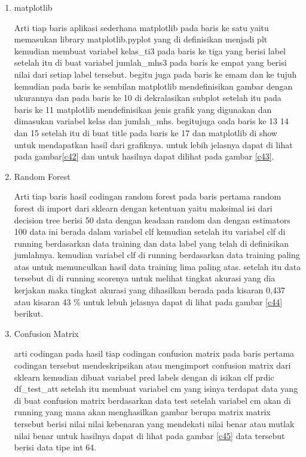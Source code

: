 \begin{enumerate}
\item matplotlib\par
Arti tiap baris aplikasi sederhana matplotlib pada baris ke satu yaitu memasukan library matplotlib.pyplot yang di definisikan menjadi plt kemudian membuat variabel kelas\_ti3 pada baris ke tiga yang berisi label setelah itu di buat variabel jumlah\_mhs3 pada baris ke empat yang berisi nilai dari setiap label tersebut. begitu juga pada baris ke emam dan ke tujuh kemudian pada baris ke sembilan matplotlib mendefinisikan gambar dengan ukurannya dan pada baris ke 10 di dekralasikan subplot setelah itu pada baris ke 11 matplotlib mendefinisikan jenis grafik yang digunakan dan dimasukan variabel kelas dan jumlah\_mhs. begitujuga oada baris ke 13 14 dan 15 setelah itu di buat title  pada baris ke 17 dan matplotlib di show untuk mendapatkan hasil dari grafiknya. untuk lebih jelasnya dapat di lihat pada gambar\ref{c42} dan untuk hasilnya dapat dilihat pada gambar \ref{c43}.

\item Random Forest\par
Arti tiap baris hasil codingan random forest pada baris pertama random forest di import dari sklearn dengan ketentuan yaitu maksimal isi dari decision tree berisi 50 data dengan keadaan random dan dengan estimators 100 data ini berada dalam variabel clf kemudian setelah itu variabel clf di running berdasarkan data training dan data label yang telah di definisikan jumlahnya. kemudian variabel clf di running berdasarkan data training paling atas untuk memunculkan hasil data training lima paling atas. setelah itu data tersebut di di running scorenya untuk melihat tingkat akurasi yang dia kerjakan maka tingkat akurasi yang dihasilkan berada pada kisaran 0,437 atau kisaran 43 \%  untuk lebuh jelasnya dapat di lihat pada gambar \ref{c44} berikut.
 
\item Confusion Matrix\par
arti codingan pada hasil tiap codingan confusion matrix pada baris pertama codingan tersebut mendeskripsikan atau mengimport confusion matrix dari sklearn kemudian dibuat variabel pred labels dengan di isikan clf prdic df\_test\_att setelah itu membuat variabel cm yang isinya terdapat data yang di buat confusion matrix berdasarkan data test setelah variabel cm akan di running yang mana akan menghasilkan gambar berupa matrix matrix tersebut berisi nilai nilai kebenaran yang mendekati nilai benar atau mutlak nilai benar untuk hasilnya dapat di lihat pada gambar \ref{c45} data tersebut berisi data tipe int 64.


\end{enumerate}
